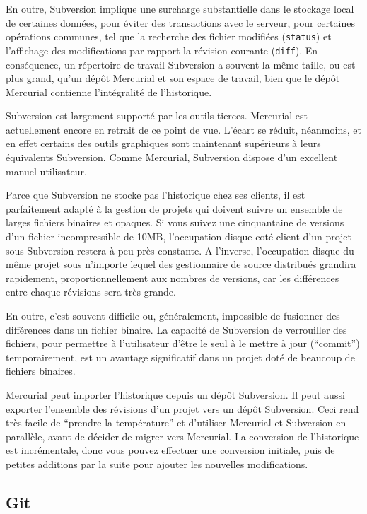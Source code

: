 En outre, Subversion implique une surcharge substantielle dans le stockage local
de certaines données, pour éviter des transactions avec le serveur, pour 
certaines opérations communes, tel que la recherche des fichier modifiées
(\texttt{status}) et l'affichage des modifications par rapport la révision 
courante (\texttt{diff}). En conséquence, un répertoire de travail Subversion
a souvent la même taille, ou est plus grand, qu'un dépôt Mercurial et son
espace de travail, bien que le dépôt Mercurial contienne l'intégralité de
l'historique.

Subversion est largement supporté par les outils tierces. Mercurial est
actuellement encore en retrait de ce point de vue. L'écart se réduit, néanmoins,
et en effet certains des outils graphiques sont maintenant supérieurs à leurs
équivalents Subversion. Comme Mercurial, Subversion dispose d'un excellent
manuel utilisateur.

Parce que Subversion ne stocke pas l'historique chez ses clients, il est 
parfaitement adapté à la gestion de projets qui doivent suivre un ensemble
de larges fichiers binaires et opaques. Si vous suivez une cinquantaine de
versions d'un fichier incompressible de 10MB, l'occupation disque coté client
d'un projet sous Subversion restera à peu près constante. A l'inverse, 
l'occupation disque du même projet sous n'importe lequel des gestionnaire
de source distribués grandira rapidement, proportionnellement aux nombres
de versions, car les différences entre chaque révisions sera très grande.

En outre, c'est souvent difficile ou, généralement, impossible de fusionner
des différences dans un fichier binaire. La capacité de Subversion de 
verrouiller des fichiers, pour permettre à l'utilisateur d'être le seul
à le mettre à jour (``commit'') temporairement, est un avantage significatif
dans un projet doté de beaucoup de fichiers binaires.

Mercurial peut importer l'historique depuis un dépôt Subversion. Il peut
aussi exporter l'ensemble des révisions d'un projet vers un dépôt Subversion.
Ceci rend très facile de ``prendre la température'' et d'utiliser Mercurial et Subversion
en parallèle, avant de décider de migrer vers Mercurial. La conversion de 
l'historique est incrémentale, donc vous pouvez effectuer une conversion 
initiale, puis de petites additions par la suite pour ajouter les nouvelles
modifications.

\subsection{Git}

